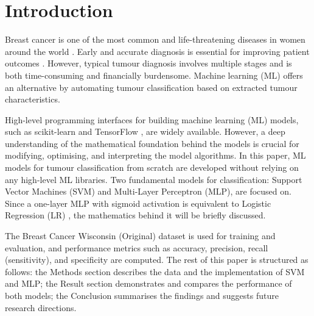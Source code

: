 \section{Introduction}

Breast cancer is one of the most common and life-threatening diseases in women around the world \cite{WHO2024}.  Early and accurate diagnosis is essential for improving patient outcomes \cite{Sun2017}. However, typical tumour diagnosis involves multiple stages \cite{Cardoso2019} and is both time-consuming and financially burdensome. Machine learning (ML) offers an alternative by automating tumour classification based on  extracted tumour characteristics. 

High-level programming interfaces for building machine learning (ML) models, such as scikit-learn \cite{scikit_learn} and TensorFlow \cite{TensorFlow2024}, are widely available. However, a deep understanding of the mathematical foundation behind the models is crucial for modifying, optimising, and interpreting the model algorithms. In this paper, ML models for tumour classification from scratch are developed without relying on any high-level ML libraries. Two fundamental models for classification: Support Vector Machines (SVM) and Multi-Layer Perceptron (MLP), are focused on. Since a one-layer MLP with sigmoid activation is equivalent to Logistic Regression (LR) \cite{Bishop2006}, the mathematics behind it will be briefly discussed.

The Breast Cancer Wisconsin (Original) dataset is used for training and evaluation, and performance metrics such as accuracy, precision, recall (sensitivity), and specificity are computed. The rest of this paper is structured as follows: the Methods section describes the data and the implementation of SVM and MLP; the Result section demonstrates and compares the performance of both models; the Conclusion summarises the findings and suggests future research directions.